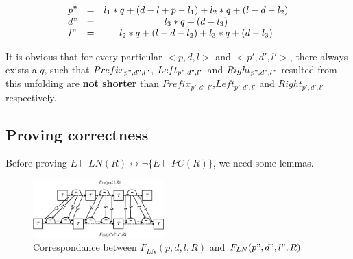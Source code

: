 \documentclass{sig-alternate}
\begin{document}
\begin{equation}
\begin{array}{ccc}
p"&=&l_1*q+(d-l+p-l_1)+l_2*q+(l-d-l_2) \\
d"&=&l_3*q+(d-l_3) \\
l"&=&l_2*q+(l-d-l_2)+l_3*q+(d-l_3)
\end{array}
\end{equation}

It is obvious that for every particular $<p,d,l>$ and $<p',d',l'>$,
there always exists a $q$,
such that $Prefix_{p",d",l"}$, $Left_{p",d",l"}$ and $Right_{p",d",l"}$ resulted from this unfolding
are \textbf{not shorter} than $Prefix_{p',d',l'}$,$Left_{p',d',l'}$ and $Right_{p',d',l'}$ respectively.



\subsection{Proving correctness}\label{subsec_correctness}

Before proving $E\vDash LN(R)\leftrightarrow \neg \{E\vDash PC(R)\}$,
we need some lemmas.

\begin{figure}[b]
\centering
\includegraphics[width=0.45\textwidth]{doubleloop_unfold_cmp}
\caption{Correspondance between $F_{LN}(p,d,l,R)$ and $F_{LN}(p",d",l",R)$}
\label{doubleloop_unfold_cmp}
\end{figure}
\end{document}
